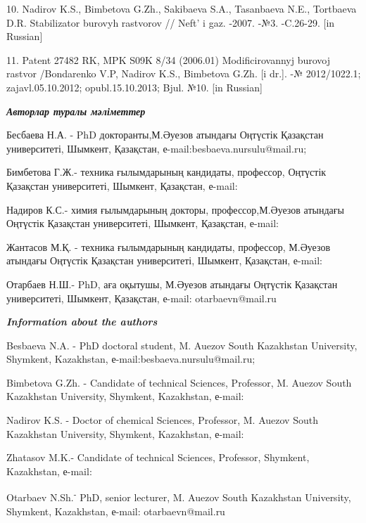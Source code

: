 \begin{references}
10. Nadirov K.S., Bimbetova G.Zh., Sakibaeva S.A., Tasanbaeva N.E.,
Tortbaeva D.R. Stabilizator burovyh rastvorov // Neft'{}
i gaz. -2007. -№3. -C.26-29. {[}in Russian{]}

11. Patent 27482 RK, MPK S09K 8/34 (2006.01) Modificirovannyj burovoj
rastvor /Bondarenko V.P, Nadirov K.S., Bimbetova G.Zh. {[}i dr.{]}. -№
2012/1022.1; zajavl.05.10.2012; opubl.15.10.2013; Bjul. №10. {[}in
Russian{]}
\end{references}

\begin{authorinfo}
\emph{{\bfseries Авторлар туралы мәліметтер}}

Бесбаева Н.А. - PhD докторанты,М.Әуезов атындағы Оңтүстік Қазақстан
университеті, Шымкент, Қазақстан, е-mail:besbaeva.nursulu@mail.ru;

Бимбетова Г.Ж.- техника ғылымдарының кандидаты, профессор, Оңтүстік
Қазақстан университеті, Шымкент, Қазақстан, е-mail:


Надиров К.С.- химия ғылымдарының докторы, профессор,М.Әуезов атындағы
Оңтүстік Қазақстан университеті, Шымкент, Қазақстан, е-mail:


Жантасов М.Қ. - техника ғылымдарының кандидаты, профессор, М.Әуезов
атындағы Оңтүстік Қазақстан университеті, Шымкент, Қазақстан, е-mail:


Отарбаев Н.Ш.- PhD, аға оқытушы, М.Әуезов атындағы Оңтүстік Қазақстан
университеті, Шымкент, Қазақстан, е-mail:
otarbaevn@mail.ru

\emph{{\bfseries Information about the authors}}

Besbaeva N.A. - PhD doctoral student, M. Auezov South Kazakhstan
University, Shymkent, Kazakhstan, е-mail:besbaeva.nursulu@mail.ru;

Bimbetova G.Zh. - Candidate of technical Sciences, Professor, M. Auezov
South Kazakhstan University, Shymkent, Kazakhstan, е-mail:


Nadirov K.S. - Doctor of chemical Sciences, Professor, M. Auezov South
Kazakhstan University, Shymkent, Kazakhstan, е-mail:


Zhatasov M.K.- Candidate of technical Sciences, Professor, Shymkent,
Kazakhstan, е-mail:


Otarbaev N.Sh.\textsuperscript{-} PhD, senior lecturer, M. Auezov South
Kazakhstan University, Shymkent, Kazakhstan, е-mail:
otarbaevn@mail.ru
\end{authorinfo}

